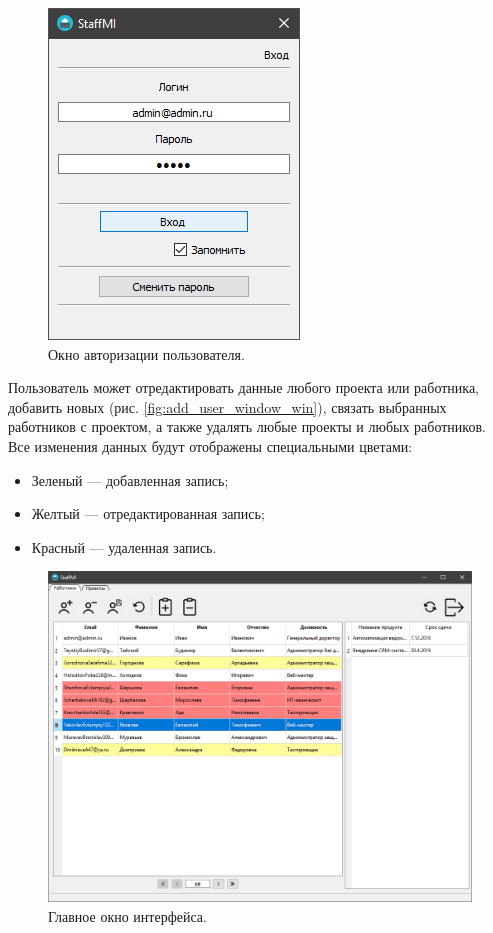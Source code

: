 \begin{figure}[h]
    \centering
    \includegraphics[width=0.4\linewidth]{img/auth_window_win.png}
    \caption{Окно авторизации пользователя.}
    \label{fig:auth_window_win}
\end{figure}

Пользователь может отредактировать данные любого проекта или работника, добавить новых (рис. \ref{fig:add_user_window_win}), связать выбранных работников с проектом, а также удалять любые проекты и любых работников. Все изменения данных будут отображены специальными цветами:
\begin{itemize}
    \item Зеленый --- добавленная запись;
    \item Желтый --- отредактированная запись;
    \item Красный --- удаленная запись.
\end{itemize}

\begin{figure}[h]
    \centering
    \includegraphics[width=1\linewidth]{img/main_window_win.png}
    \caption{Главное окно интерфейса.}
    \label{fig:main_window_win}
\end{figure}

